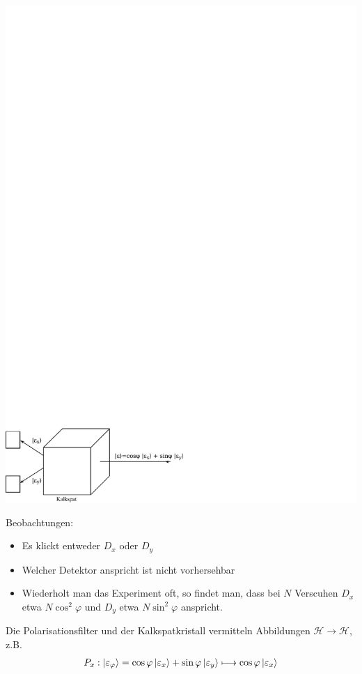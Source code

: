 \documentclass[a4paper]{scrartcl}
\begin{document}
{\begin{center}
\includegraphics{004Kalkspat}
\end{center}
Beobachtungen:
\begin{itemize}
\item Es klickt entweder $D_x$ oder $D_y$
\item Welcher Detektor anspricht ist nicht vorhersehbar
\item Wiederholt man das Experiment oft, so findet man, dass bei $N$ Verscuhen $D_x$ etwa $N \cos^2 \varphi$ und $D_y$ etwa $N \sin^2\varphi$ anspricht.
\end{itemize}
Die Polarisationsfilter und der Kalkspatkristall vermitteln Abbildungen $\mathcal H \longrightarrow \mathcal H$, z.B.
\begin{align}
P_x: \Ket{ \varepsilon_\varphi } = \cos \varphi \Ket{ \varepsilon_x } + \sin \varphi \Ket{ \varepsilon_y } \longmapsto \cos \varphi \Ket{ \varepsilon_x }
\end{align}
}
\end{document}
